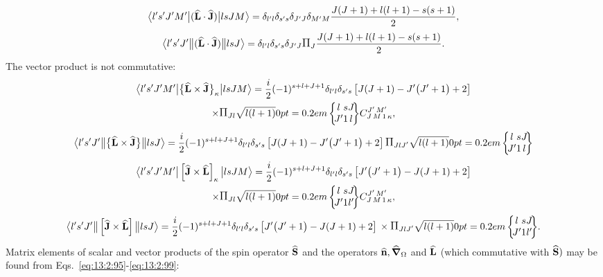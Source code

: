 \begin{equation}
\bigl\langle  l^{\prime} s^{\prime} J^{\prime} M^{\prime} \big| (\widehat{\mathbf{L}} \cdot \widehat{\mathbf{J}}) \big| l s J M \bigr\rangle=\delta_{l^{\prime} l} \delta_{s^{\prime} s} \delta_{J^{\prime} J} \delta_{M^{\prime} M} \frac{J(J+1)+l(l+1)-s(s+1)}{2}, \label{eq:13:2:163}
\end{equation}
\begin{equation*}
\braOketred{ l^{\prime} s^{\prime} J^{\prime}}{(\widehat{\vect{L}} \cdot \widehat{\vect{J}})}{l s J}=\delta_{l^{\prime} l} \delta_{s^{\prime} s} \delta_{J^{\prime} J} \Fact{J} \frac{J(J+1)+l(l+1)-s(s+1)}{2}.
\end{equation*}
The vector product is not commutative:
\begin{gather}
\braOket{ l^{\prime} s^{\prime} J^{\prime} M^{\prime}}{\bigl\{\widehat{\vect{L}} \times \widehat{\vect{J}}\bigr\}_{\kappa}}{l s J M}=\frac{i}{2}(-1)^{s+l+J+1} \delta_{l^{\prime} l} \delta_{s^{\prime} s} \left[ J(J+1)-J^{\prime}\bigl(J^{\prime}+1\bigr)+2\right] \notag\\
\times \Fact{J l}\sqrt{ l(l+1)}
\sixj{l}{s}{J}{J^{\prime}}{1}{l}
\clebsch{J}{M}{1}{\kappa}{J^{\prime}}{M^{\prime}},  \label{eq:13:2:164}
\end{gather}
\begin{equation*}
\braOketred{ l^{\prime} s^{\prime} J^{\prime}}{\bigl\{\widehat{\vect{L}} \times \widehat{\vect{J}}\bigr\}}{l s J}=\frac{i}{2}(-1)^{s+l+J+1} \delta_{l^{\prime} l} \delta_{s^{\prime} s} \left[ J(J+1)-J^{\prime}\bigl(J^{\prime}+1\bigr)+2\right]  \Fact{J l J^{\prime}}\sqrt{ l(l+1)}
\sixj{l}{s}{J}{J^{\prime}}{1}{l}
\end{equation*}
\begin{gather}
\braOket{ l^{\prime} s^{\prime} J^{\prime} M^{\prime}}{\left[\widehat{\vect{J}} \times \widehat{\vect{L}}\right]_{\kappa}}{l s J M}=\frac{i}{2}(-1)^{s+l+J+1} \delta_{l^{\prime} l} \delta_{s^{\prime} s}\left[J^{\prime}\bigl(J^{\prime}+1\bigr)-J(J+1)+2\right] \notag\\
\times \Fact{J l}\sqrt{ l(l+1)}
\sixj{l}{s}{J}{J^{\prime}}{1}{l^{\prime}}
\clebsch{J}{M}{1}{\kappa}{J^{\prime}}{M^{\prime}}, \label{eq:13:2:165}
\end{gather}
\begin{equation*}
\braOketred{ l^{\prime} s^{\prime} J^{\prime}}{\left[\widehat{\vect{J}} \times \widehat{\vect{L}}\right]}{l s J}=\frac{i}{2}(-1)^{s+l+J+1} \delta_{l^{\prime} l} \delta_{s^{\prime} s}\left[J^{\prime}\bigl(J^{\prime}+1\bigr)-J(J+1)+2\right] \\
\times \Fact{J l J^{\prime}}\sqrt{ l(l+1)}
\sixj{l}{s}{J}{J^{\prime}}{1}{l^{\prime}}.
\end{equation*}
Matrix elements of scalar and vector products of the spin operator \(\widehat{\mathbf{S}}\) and the operators \(\widehat{\mathbf{n}}, \widehat{\boldsymbol{\nabla}}_{\Omega}\) and \(\widehat{\mathbf{L}}\) (which commutative with \(\widehat{\mathbf{S}})\) may be found from Eqs.~\eqref{eq:13:2:95}-\eqref{eq:13:2:99}:

